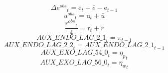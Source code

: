 \begin{dmath}
{{\Delta e^{obs}}}_{t}={{\mathrm{e}}}_{t}+{{\bar{e}}}-{{\mathrm{e}}}_{t-1}
\end{dmath}
\begin{dmath}
{{u^{obs}}}_{t}={{\mathrm{u}}}_{t}+{{\bar{u}}}
\end{dmath}
\begin{dmath}
\frac{{{r^{obs}}}_{t}}{4}={{\mathrm{r}}}_{t}+{{\bar{r}}}
\end{dmath}
\begin{dmath}
{AUX\_ENDO\_LAG\_2\_1}_{t}={{\pi}}_{t-1}
\end{dmath}
\begin{dmath}
{AUX\_ENDO\_LAG\_2\_2}_{t}={AUX\_ENDO\_LAG\_2\_1}_{t-1}
\end{dmath}
\begin{dmath}
{AUX\_EXO\_LAG\_54\_0}_{t}={{\eta_{p}}}_{t}
\end{dmath}
\begin{dmath}
{AUX\_EXO\_LAG\_56\_0}_{t}={{\eta_{w}}}_{t}
\end{dmath}
